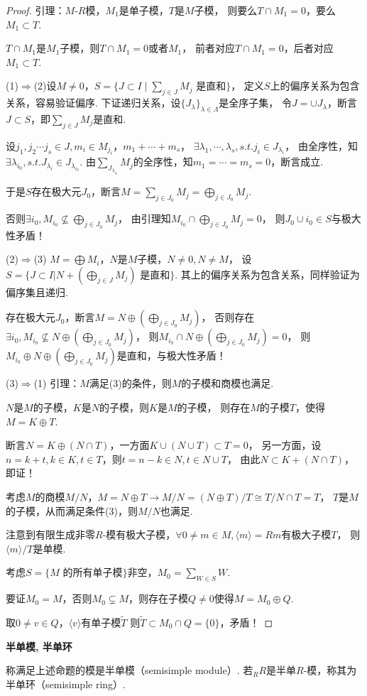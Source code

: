 \begin{proof}
引理：$M$-$R$模，$M_1$是单子模，$T$是$M$子模，
则要么$T \cap M_1={0}$，要么$M_1\subset T$.

$T \cap M_1$是$M_1$子模，则$T \cap M_1={0}$或者$M_1$，
前者对应$T \cap M_1={0}$，后者对应$M_1\subset T$.

(1)$\Rightarrow$(2)设$M \neq0$，$S=\{J\subset I\mid\sum\limits_{j\in J}M_j\text{ 是直和} \}$，
定义$S$上的偏序关系为包含关系，容易验证偏序.
下证递归关系，设$\{J_\lambda\}_{\lambda \in \Lambda}$是全序子集，
令$J=\cup J_\lambda$，断言$J\subset S$，即$\sum\limits_{j\in J}M_j$是直和.

设$j_1,j_2\cdots j_s\in J,m_i\in M_{j_i}$，$m_1+\cdots+m_s$，
$\exists\lambda_1,\cdots,\lambda_s,s.t.j_i\in J_{\lambda_i}$，
由全序性，知$\exists \lambda_{i_0},s.t.J_{\lambda_i}\in J_{\lambda_{i_0}}$.
由$\sum\limits_{J_{\lambda_{i_0}}}M_j$的全序性，知$m_1=\cdots =m_s=0$，断言成立.

于是$S$存在极大元$J_0$，断言$M=\sum\limits_{j\in J_0}M_j=\bigoplus\limits_{j\in J_0}M_j$.

否则$\exists i_0,M_{i_0}\nsubseteq\bigoplus\limits_{j\in J_0}M_j$，
由引理知$M_{i_0}\cap \bigoplus\limits_{j\in J_0}M_j=0$，
则$J_0\cup{i_0}\in S$与极大性矛盾！

(2)$\Rightarrow$(3) $M=\bigoplus M_i$，$N$是$M$子模，$N\neq0,N\neq M$，
设$S=\{J\subset I|N+(\bigoplus\limits_{j\in J}M_j) \text{ 是直和}\}$.
其上的偏序关系为包含关系，同样验证为偏序集且递归.

存在极大元$J_0$，断言$M=N\oplus(\bigoplus\limits_{j\in J_0}M_j)$，
否则存在$\exists i_0,M_{i_0}\nsubseteq N\oplus(\bigoplus\limits_{j\in J_0}M_j)$，
则$M_{i_0}\cap N\oplus(\bigoplus\limits_{j\in J_0}M_j)={0}$，
则$ M_{i_0}\oplus N\oplus(\bigoplus\limits_{j\in J_0}M_j) $是直和，与极大性矛盾！

(3)$\Rightarrow$(1) 引理：$M$满足(3)的条件，则$M$的子模和商模也满足.

$N$是$M$的子模，$K$是$N$的子模，则$K$是$M$的子模，
则存在$M$的子模$T$，使得$M=K\oplus T$.

断言$N=K\oplus (N\cap T)$，一方面$K\cup (N\cup T)\subset T=0$，
另一方面，设$n=k+t,k\in K,t\in T$，则$t=n-k\in N,t\in N\cup T$，
由此$N\subset K+(N\cap T)$，即证！

考虑$M$的商模$M/N$，$M=N\oplus T\rightarrow M/N=(N\oplus T)/T\cong T/N\cap T=T$，
$T$是$M$的子模，从而满足条件(3)，则$M/N$也满足.

注意到有限生成非零$R$-模有极大子模，$\forall 0\neq m\in M,\langle m \rangle=Rm$有极大子模$T$，
则$\langle m\rangle  /T$是单模.

考虑$S=\{M\text{ 的所有单子模}\}$非空，$M_0=\sum\limits_{W\in S}W$.

要证$M_0=M$，否则$M_0\subsetneq M$，则存在子模$Q\neq 0$使得$M=M_0\oplus Q$.

取$0\neq v \in Q$，$\langle v \rangle$有单子模$\tilde{T}$
则$\tilde{T}\subset M_0\cap Q=\{0\}$，矛盾！
\end{proof}
\begin{definition}\textbf{半单模, 半单环}\par
    \qquad 称满足上述命题的模是半单模（semisimple module）. 
    若$_RR$是半单$R$-模，称其为半单环（semisimple ring）.
\end{definition}

